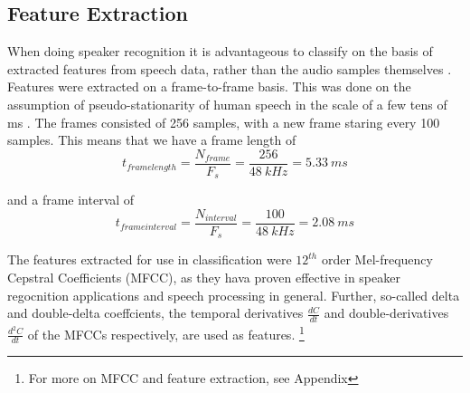 \subsection*{Feature Extraction}
When doing speaker recognition it is advantageous to classify on the basis of extracted features from speech data, rather than the audio samples themselves \cite{Springer:36}.
Features were extracted on a frame-to-frame basis.
This was done on the assumption of pseudo-stationarity of human speech in the scale of a few tens of ms \cite{Springer:36}.
The frames consisted of 256 samples, with a new frame staring every 100 samples.
This means that we have a frame length of
\begin{equation}
t_{frame length} = \dfrac{N_{frame}}{F_s} = \dfrac{256}{48\ kHz} = 5.33\ ms
\end{equation}

and a frame interval of
\begin{equation}
t_{frame interval} = \dfrac{N_{interval}}{F_s} = \dfrac{100}{48\ kHz} = 2.08\ ms
\end{equation}

The features extracted for use in classification were $12^{th}$ order Mel-frequency Cepstral Coefficients (MFCC), as they hava proven effective in speaker regocnition applications and speech processing in general.
Further, so-called delta and double-delta coeffcients, the temporal derivatives $ \frac{dC}{dt} $ and double-derivatives $\frac{d^2C}{dt}$ of the MFCCs respectively, are used as features.
\footnote{For more on MFCC and feature extraction, see Appendix} 